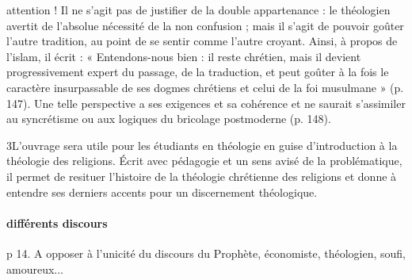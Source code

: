 attention ! Il ne s’agit pas de justifier de la double appartenance : le théologien avertit de l’absolue nécessité de la non confusion ; mais il s’agit de pouvoir goûter l’autre tradition, au point de se sentir comme l’autre croyant. Ainsi, à propos de l’islam, il écrit : « Entendons-nous bien : il reste chrétien, mais il devient progressivement expert du passage, de la traduction, et peut goûter à la fois le caractère insurpassable de ses dogmes chrétiens et celui de la foi musulmane » (p. 147). Une telle perspective a ses exigences et sa cohérence et ne saurait s’assimiler au syncrétisme ou aux logiques du bricolage postmoderne (p. 148).

3L’ouvrage sera utile pour les étudiants en théologie en guise d’introduction à la théologie des religions. Écrit avec pédagogie et un sens avisé de la problématique, il permet de resituer l’histoire de la théologie chrétienne des religions et donne à entendre ses derniers accents pour un discernement théologique.

\paragraph{différents discours} p 14. A opposer à l'unicité du discours du Prophète, économiste, théologien, soufi, amoureux...